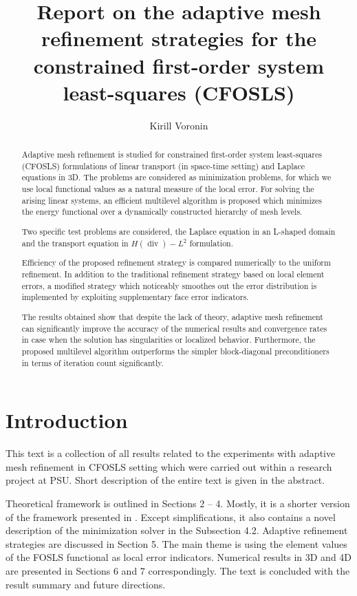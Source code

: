 \documentclass[a4paper,12pt]{amsart}
\title[Report on adaptive mesh refinement in CFOSLS] 
{Report on the adaptive mesh refinement strategies for the constrained first-order system least-squares (CFOSLS)}
\author{Kirill Voronin}
\numberwithin{equation}{section}
\renewcommand{\div}{\operatorname{div}}
\begin{document}
 
\begin{abstract}
Adaptive mesh refinement is studied for constrained first-order system least-squares (CFOSLS) formulations of linear transport (in space-time setting) and Laplace equations in 3D. The problems are considered as minimization problems, for which we use local functional values as a natural measure of the local error. For solving the arising linear systems, an efficient multilevel algorithm is proposed which minimizes the energy functional over a dynamically constructed hierarchy of mesh levels.

Two specific test problems are considered, the Laplace equation in an L-shaped domain and the transport equation in $H(\div)-L^2$ formulation.

Efficiency of the proposed refinement strategy is compared numerically to the uniform refinement. In addition to the traditional refinement strategy based on local element errors, a modified strategy which noticeably smoothes out the error distribution is implemented by exploiting supplementary face error indicators.

The results obtained show that despite the lack of theory, adaptive mesh refinement can significantly improve the accuracy of the numerical results and convergence rates in case when the solution has singularities or localized behavior. Furthermore, the proposed multilevel algorithm outperforms the simpler block-diagonal preconditioners in terms of iteration count significantly.
\end{abstract}
\maketitle

\section{Introduction}

This text is a collection of all results related to the experiments with adaptive mesh refinement in CFOSLS setting which were carried out within a research project at PSU.
Short description of the entire text is given in the abstract.

Theoretical framework is outlined in Sections 2 -- 4. Mostly, it is a shorter version of the framework presented in \cite{our_cfosls_paper}. Except simplifications, it also contains a novel description of the minimization solver in the Subsection 4.2.
Adaptive refinement strategies are discussed in Section 5. The main theme is using the element values of the FOSLS functional as local error indicators.
Numerical results in 3D and 4D are presented in Sections 6 and 7 correspondingly.
The text is concluded with the result summary and future directions.
\end{document}
